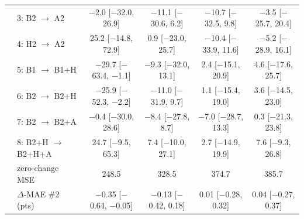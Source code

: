 \documentclass{article}
\newcommand{\cto}{$\rightarrow$}
\begin{document}
\begin{table}[h]
{\begin{tabular}{llcccc}
 & 3: B2 \cto{} A2 & $-$2.0 [$-$32.0, 26.9] & $-$11.1 [$-$30.6, 6.2] & $-$10.7 [$-$32.5, 9.8] & $-$3.5 [$-$25.7, 20.4] \\
 & 4: H2 \cto{} A2 & 25.2 [$-$14.8, 72.9] & 0.9 [$-$23.0, 25.7] & $-$10.4 [$-$33.9, 11.6] & $-$5.2 [$-$28.9, 16.1] \\
 & 5: B1 \cto{} B1+H & $-$29.7 [$-$63.4, $-$1.1] & $-$9.3 [$-$32.0, 13.1] & 2.4 [$-$15.1, 20.9] & 4.6 [$-$17.6, 25.7] \\
 & 6: B2 \cto{} B2+H & $-$25.9 [$-$52.3, $-$2.2] & $-$11.0 [$-$31.9, 9.7] & 1.1 [$-$15.4, 19.0] & 3.6 [$-$14.5, 23.0] \\
 & 7: B2 \cto{} B2+A & $-$0.4 [$-$30.0, 28.6] & $-$8.4 [$-$27.8, 8.7] & $-$7.0 [$-$28.7, 13.3] & 0.3 [$-$21.3, 23.8] \\
 & 8: B2+H \cto{} B2+H+A & 24.7 [$-$9.5, 65.3] & 7.4 [$-$10.0, 27.1] & 2.7 [$-$14.9, 19.9] & 7.6 [$-$9.3, 26.8] \\
 & zero-change MSE & 248.5 & 328.5 & 374.7 & 385.7 \\
 & $\Delta$-MAE \#2 (pts) & $-$0.35 [$-$0.64, $-$0.05] & $-$0.13 [$-$0.42, 0.18] & 0.01 [$-$0.28, 0.32] & 0.04 [$-$0.27, 0.37] \\
\bottomrule
\end{tabular}
}
\end{table}
\end{document}
